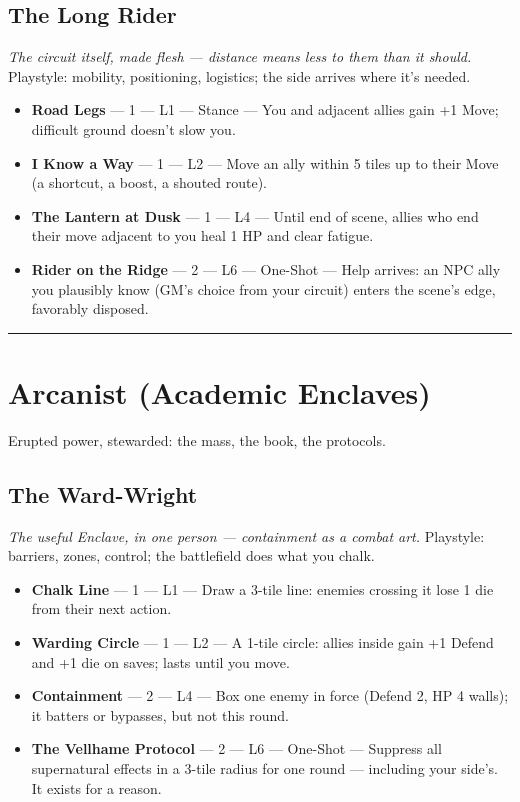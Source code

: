 \subsection{The Long Rider}
\textit{The circuit itself, made flesh --- distance means less to them than it should.} Playstyle: mobility, positioning, logistics; the side arrives where it's needed.
\begin{itemize}
    \item \textbf{Road Legs} --- 1 --- L1 --- Stance --- You and adjacent allies gain +1 Move; difficult ground doesn't slow you.
    \item \textbf{I Know a Way} --- 1 --- L2 --- Move an ally within 5 tiles up to their Move (a shortcut, a boost, a shouted route).
    \item \textbf{The Lantern at Dusk} --- 1 --- L4 --- Until end of scene, allies who end their move adjacent to you heal 1 HP and clear fatigue.
    \item \textbf{Rider on the Ridge} --- 2 --- L6 --- One-Shot --- Help arrives: an NPC ally you plausibly know (GM's choice from your circuit) enters the scene's edge, favorably disposed.
\end{itemize}

\medskip\hrule\medskip

\section{Arcanist \textnormal{(Academic Enclaves)}}

Erupted power, stewarded: the mass, the book, the protocols.

\subsection{The Ward-Wright}
\textit{The useful Enclave, in one person --- containment as a combat art.} Playstyle: barriers, zones, control; the battlefield does what you chalk.
\begin{itemize}
    \item \textbf{Chalk Line} --- 1 --- L1 --- Draw a 3-tile line: enemies crossing it lose 1 die from their next action.
    \item \textbf{Warding Circle} --- 1 --- L2 --- A 1-tile circle: allies inside gain +1 Defend and +1 die on saves; lasts until you move.
    \item \textbf{Containment} --- 2 --- L4 --- Box one enemy in force (Defend 2, HP 4 walls); it batters or bypasses, but not this round.
    \item \textbf{The Vellhame Protocol} --- 2 --- L6 --- One-Shot --- Suppress all supernatural effects in a 3-tile radius for one round --- including your side's. It exists for a reason.
\end{itemize}

